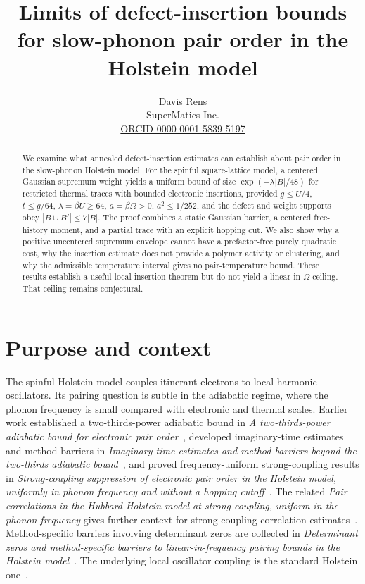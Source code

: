\documentclass[11pt]{article}
\title{Limits of defect-insertion bounds for slow-phonon pair order in the Holstein model}
\author{Davis Rens\\SuperMatics Inc.\\\href{https://orcid.org/0000-0001-5839-5197}{ORCID 0000-0001-5839-5197}}
\date{\smash{\parbox{.98\linewidth}{\centering\scriptsize
Article DOI: \href{https://doi.org/10.5281/zenodo.24385569}{\LIMITSPAPERDOI}\quad Supplement DOI: \href{https://doi.org/10.5281/zenodo.24385573}{\LIMITSSUPPDOI}\\
Source repository: \expandafter\url\expandafter{\LIMITSREPO}
}}}
\theoremstyle{remark}
\begin{document}
\maketitle

\begin{abstract}
We examine what annealed defect-insertion estimates can establish about pair order in the slow-phonon Holstein model. For the spinful square-lattice model, a centered Gaussian supremum weight yields a uniform bound of size $\exp(-\lambda |B|/48)$ for restricted thermal traces with bounded electronic insertions, provided $g\le U/4$, $t\le g/64$, $\lambda=\beta U\ge64$, $a=\beta\Omega>0$, $a^2\le1/252$, and the defect and weight supports obey $|B\cup B'|\le7|B|$. The proof combines a static Gaussian barrier, a centered free-history moment, and a partial trace with an explicit hopping cut. We also show why a positive uncentered supremum envelope cannot have a prefactor-free purely quadratic cost, why the insertion estimate does not provide a polymer activity or clustering, and why the admissible temperature interval gives no pair-temperature bound. These results establish a useful local insertion theorem but do not yield a linear-in-$\Omega$ ceiling. That ceiling remains conjectural.
\end{abstract}

\section{Purpose and context}

The spinful Holstein model couples itinerant electrons to local harmonic oscillators. Its pairing question is subtle in the adiabatic regime, where the phonon frequency is small compared with electronic and thermal scales. Earlier work established a two-thirds-power adiabatic bound in \textit{A two-thirds-power adiabatic bound for electronic pair order}~\cite{linear4}, developed imaginary-time estimates and method barriers in \textit{Imaginary-time estimates and method barriers beyond the two-thirds adiabatic bound}~\cite{linear5}, and proved frequency-uniform strong-coupling results in \textit{Strong-coupling suppression of electronic pair order in the Holstein model, uniformly in phonon frequency and without a hopping cutoff}~\cite{stage6}. The related \textit{Pair correlations in the Hubbard-Holstein model at strong coupling, uniform in the phonon frequency} gives further context for strong-coupling correlation estimates~\cite{hubhol}. Method-specific barriers involving determinant zeros are collected in \textit{Determinant zeros and method-specific barriers to linear-in-frequency pairing bounds in the Holstein model}~\cite{barriers}. The underlying local oscillator coupling is the standard Holstein one~\cite{holstein}.
\end{document}
